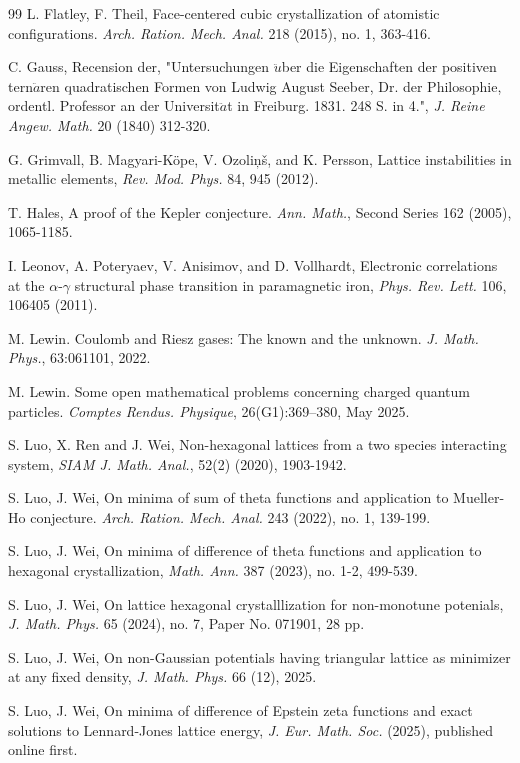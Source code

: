 \documentclass[reqno,english]{amsart}
\theoremstyle{definition}
\newtheorem{open problem}[theorem]{Open Problem}
\theoremstyle{remark}
\theoremstyle{plain}
\numberwithin{equation}{section}
\begin{document}
\begin{thebibliography}{99}
L. Flatley, F. Theil, Face-centered cubic crystallization of atomistic configurations. {\em Arch. Ration. Mech. Anal.} 218 (2015), no. 1, 363-416.

C. Gauss, Recension der, "Untersuchungen $\ddot{u}$ber die Eigenschaften der positiven tern$\ddot{a}$ren quadratischen Formen von Ludwig August Seeber, Dr. der Philosophie, ordentl. Professor an der Universit$\ddot{a}$t in Freiburg. 1831. 248 S. in 4.", {\em J. Reine Angew. Math.} 20 (1840) 312-320.


G. Grimvall, B. Magyari-K\"{o}pe, V. Ozoli\c{n}\v{s}, and K. Persson,
Lattice instabilities in metallic elements, {\em Rev. Mod. Phys.} {84}, 945 (2012).

T. Hales, A proof of the Kepler conjecture. {\em Ann. Math.}, Second Series 162 (2005), 1065-1185.


I. Leonov, A. Poteryaev, V. Anisimov, and D. Vollhardt,
Electronic correlations at the $\alpha$-$\gamma$ structural phase transition in paramagnetic iron,
{\em Phys. Rev. Lett.} {106}, 106405 (2011).

 M. Lewin. Coulomb and Riesz gases: The known and the unknown. {\em J. Math. Phys.}, 63:061101, 2022.

M. Lewin. Some open mathematical problems concerning charged quantum particles. {\em Comptes Rendus. Physique}, 26(G1):369--380, May 2025.

 S. Luo, X. Ren and J. Wei,
Non-hexagonal lattices from a two species interacting system, {\em SIAM J. Math. Anal.}, 52(2) (2020), 1903-1942.

S. Luo, J. Wei, On minima of sum of theta functions and application to Mueller-Ho conjecture. {\em Arch. Ration. Mech. Anal.} 243 (2022), no. 1, 139-199.


S. Luo, J. Wei, On minima of difference of theta functions and application to hexagonal crystallization, {\em Math. Ann.} 387 (2023), no. 1-2, 499-539.


S. Luo, J. Wei, On lattice hexagonal crystalllization for non-monotune potenials,  {\em J. Math. Phys.} 65 (2024), no. 7, Paper No. 071901, 28 pp.

S. Luo, J. Wei,
On non-Gaussian potentials having triangular lattice as minimizer at any fixed density,
{\em J. Math. Phys.} 66 (12), 2025.

S. Luo, J. Wei, On minima of difference of Epstein zeta functions and exact solutions to Lennard-Jones lattice energy,
{\em J. Eur. Math. Soc.} (2025), published online first.


\end{thebibliography}
\end{document}
